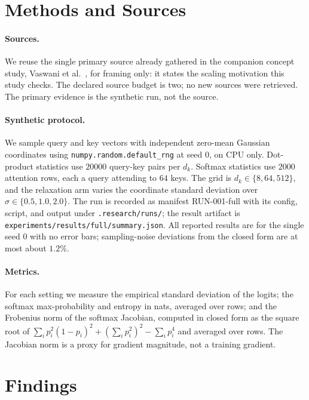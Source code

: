 \documentclass{article}
\begin{document}
\section{Methods and Sources}

\paragraph{Sources.} We reuse the single primary source already gathered in
the companion concept study, Vaswani et al.~\citep{vaswani2017attention}, for
framing only: it states the scaling motivation this study checks. The declared
source budget is two; no new sources were retrieved. The primary evidence is
the synthetic run, not the source.

\paragraph{Synthetic protocol.} We sample query and key vectors with
independent zero-mean Gaussian coordinates using
\texttt{numpy.random.default\_rng} at seed $0$, on CPU only. Dot-product
statistics use $20000$ query-key pairs per $d_k$. Softmax statistics use
$2000$ attention rows, each a query attending to $64$ keys. The grid is
$d_k \in \{8, 64, 512\}$, and the relaxation arm varies the coordinate
standard deviation over $\sigma \in \{0.5, 1.0, 2.0\}$. The run is recorded as
manifest RUN-001-full with its config, script, and output under
\texttt{.research/runs/}; the result artifact is
\texttt{experiments/results/full/summary.json}. All reported results are for
the single seed $0$ with no error bars; sampling-noise deviations from the
closed form are at most about $1.2\%$.

\paragraph{Metrics.} For each setting we measure the empirical standard
deviation of the logits; the softmax max-probability and entropy in nats,
averaged over rows; and the Frobenius norm of the softmax Jacobian, computed in
closed form as the square root of
$\sum_i p_i^2(1-p_i)^2 + (\sum_i p_i^2)^2 - \sum_i p_i^4$ and
averaged over rows. The Jacobian norm is a proxy for gradient magnitude, not a
training gradient.

\section{Findings}
\end{document}
